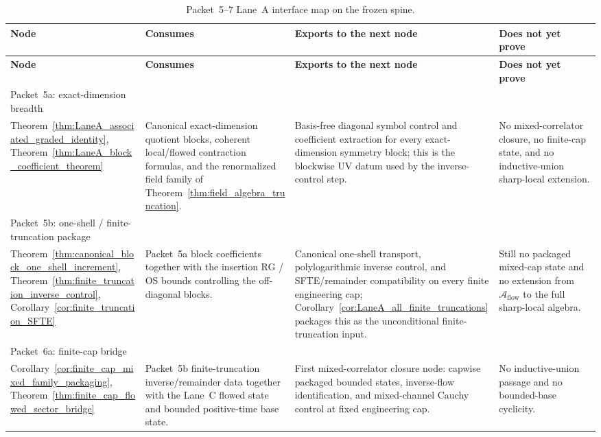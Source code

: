 \begingroup
\small
\setlength{\tabcolsep}{4pt}
\begin{longtable}{@{}>{\RaggedRight\arraybackslash}p{}>{\RaggedRight\arraybackslash}p{}>{\RaggedRight\arraybackslash}p{}>{\RaggedRight\arraybackslash}p{}@{}}
\caption{Packet~5--7 Lane~A interface map on the frozen spine.}\label{tab:LaneA_packet_interface_map}\\
\toprule
\textbf{Node} & \textbf{Consumes} & \textbf{Exports to the next node} & \textbf{Does not yet prove}\\
\midrule
\endfirsthead
\toprule
\textbf{Node} & \textbf{Consumes} & \textbf{Exports to the next node} & \textbf{Does not yet prove}\\
\midrule
\endhead
Packet~5a: exact-dimension breadth\\
Theorem~\ref{thm:LaneA_associated_graded_identity}, Theorem~\ref{thm:LaneA_block_coefficient_theorem}
& Canonical exact-dimension quotient blocks, coherent local/flowed contraction formulas, and the renormalized field family of Theorem~\ref{thm:field_algebra_truncation}.
& Basis-free diagonal symbol control and coefficient extraction for every exact-dimension symmetry block; this is the blockwise UV datum used by the inverse-control step.
& No mixed-correlator closure, no finite-cap state, and no inductive-union sharp-local extension.\\[0.45em]

Packet~5b: one-shell / finite-truncation package\\
Theorem~\ref{thm:canonical_block_one_shell_increment}, Theorem~\ref{thm:finite_truncation_inverse_control}, Corollary~\ref{cor:finite_truncation_SFTE}
& Packet~5a block coefficients together with the insertion RG / OS bounds controlling the off-diagonal blocks.
& Canonical one-shell transport, polylogarithmic inverse control, and SFTE/remainder compatibility on every finite engineering cap; Corollary~\ref{cor:LaneA_all_finite_truncations} packages this as the unconditional finite-truncation input.
& Still no packaged mixed-cap state and no extension from $\mathcal A_{\mathrm{flow}}$ to the full sharp-local algebra.\\[0.45em]

Packet~6a: finite-cap bridge\\
Corollary~\ref{cor:finite_cap_mixed_family_packaging}, Theorem~\ref{thm:finite_cap_flowed_sector_bridge}
& Packet~5b finite-truncation inverse/remainder data together with the Lane~C flowed state and bounded positive-time base state.
& First mixed-correlator closure node: capwise packaged bounded states, inverse-flow identification, and mixed-channel Cauchy control at fixed engineering cap.
& No inductive-union passage and no bounded-base cyclicity.\\[0.45em]


\end{longtable}
